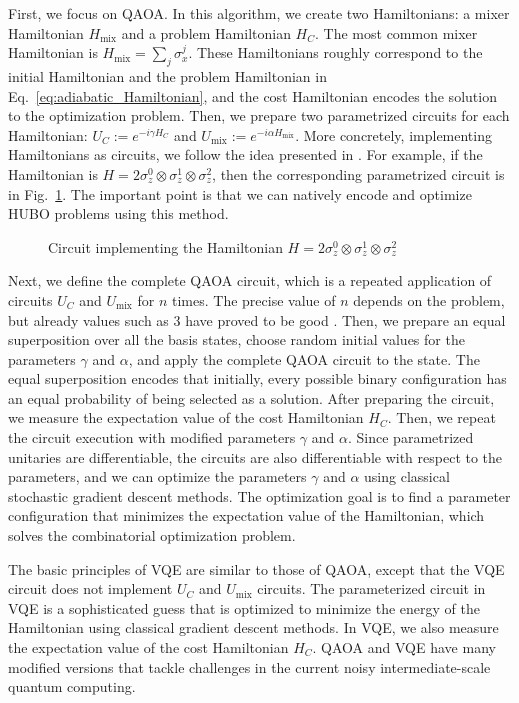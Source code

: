 First, we focus on QAOA. In this algorithm, we create two Hamiltonians: a mixer Hamiltonian $H_{\mathrm{mix}}$ and a problem Hamiltonian $H_{C}$. The most common mixer Hamiltonian is $H_{\mathrm{mix}} = \sum_{j}\sigma_{x}^{j}$. These Hamiltonians roughly correspond to the initial Hamiltonian and the problem Hamiltonian in Eq.~\eqref{eq:adiabatic_Hamiltonian}, and the cost Hamiltonian encodes the solution to the optimization problem. Then, we prepare two parametrized circuits for each Hamiltonian: $U_{C}:= e^{-i\gamma H_C}$ and $U_{\mathrm{mix}}:= e^{-i\alpha H_{\mathrm{mix}}}$. More concretely, implementing Hamiltonians as circuits, we follow the idea presented in \cite{Nielsen_Chuang_2010}. For example, if the Hamiltonian is $H = 2\sigma_{z}^{0} \otimes \sigma_{z}^{1} \otimes \sigma_{z}^{2}$, then the corresponding parametrized circuit is in Fig.~\ref{fig:circuit_example}. The important point is that we can natively encode and optimize HUBO problems using this method.
\begin{figure}
    \centering
    
    \caption{Circuit implementing the Hamiltonian $H = 2 \sigma_{z}^{0} \otimes \sigma_{z}^{1} \otimes \sigma_{z}^{2}$}
    \label{fig:circuit_example}
\end{figure}
Next, we define the complete QAOA circuit, which is a repeated application of circuits $U_C$ and $U_{\mathrm{mix}}$ for $n$ times. The precise value of $n$ depends on the problem, but already values such as $3$ have proved to be good \cite{farhi2014quantum}. Then, we prepare an equal superposition over all the basis states, choose random initial values for the parameters $\gamma$ and $\alpha$, and apply the complete QAOA circuit to the state. The equal superposition encodes that initially, every possible binary configuration has an equal probability of being selected as a solution. After preparing the circuit, we measure the expectation value of the cost Hamiltonian $H_C$. Then, we repeat the circuit execution with modified parameters $\gamma$ and $\alpha$. Since parametrized unitaries are differentiable, the circuits are also differentiable with respect to the parameters, and we can optimize the parameters $\gamma$ and $\alpha$ using classical stochastic gradient descent methods. The optimization goal is to find a parameter configuration that minimizes the expectation value of the Hamiltonian, which solves the combinatorial optimization problem.

The basic principles of VQE are similar to those of QAOA, except that the VQE circuit does not implement $U_C$ and $U_{\mathrm{mix}}$ circuits. The parameterized circuit in VQE is a sophisticated guess that is optimized to minimize the energy of the Hamiltonian using classical gradient descent methods. In VQE, we also measure the expectation value of the cost Hamiltonian $H_C$. QAOA and VQE have many modified versions that tackle challenges in the current noisy intermediate-scale quantum computing. 